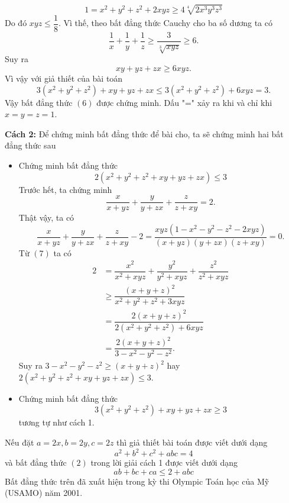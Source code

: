 \begin{bt}
{\begin{itemize}
			$$1=x^2+y^2+z^2+2xyz\geq 4\sqrt[4]{2x^3y^3z^3}$$
			Do đó $xyz\leq \dfrac{1}{8}$. Vì thế, theo bất đẳng thức Cauchy cho ba số dương ta có
			$$\dfrac{1}{x}+\dfrac{1}{y}+\dfrac{1}{z}\geq \dfrac{3}{\sqrt[3]{xyz}}\geq 6.$$
			Suy ra $$xy+yz+zx\geq 6xyz.$$
			Vì vậy với giả thiết của bài toán 
			$$3(x^2+y^2+z^2)+xy+yz+zx\leq 3(x^2+y^2+z^2)+6xyz=3.$$
			Vậy bất đẳng thức $(6)$ được chứng minh. Dấu "=" xảy ra khi và chỉ khi $x=y=z=1$.
		\end{itemize}
		\noindent\textbf{Cách 2:} Để chứng minh bất đẳng thức để bài cho, ta sẽ chứng minh hai bất đẳng thức sau
		\begin{itemize}
			\item Chứng minh bất đẳng thức
			$$2(x^2+y^2+z^2+xy+yz+zx)\leq 3$$
			Trước hết, ta chứng minh 
			\begin{equation}
			\tag{7}
			\dfrac{x}{x+yz}+\dfrac{y}{y+zx}+\dfrac{z}{z+xy}=2.
			\end{equation}
			Thật vậy, ta có
			$$\dfrac{x}{x+yz}+\dfrac{y}{y+zx}+\dfrac{z}{z+xy}-2=\dfrac{xyz(1-x^2-y^2-z^2-2xyz)}{(x+yz)(y+zx)(z+xy)}=0.$$
			Từ $(7)$ ta có
			{\allowdisplaybreaks
			\begin{align*}
			2&=\dfrac{x^2}{x^2+xyz}+\dfrac{y^2}{y^2+xyz}+\dfrac{z^2}{z^2+xyz}\\
			& \geq \dfrac{(x+y+z)^2}{x^2+y^2+z^2+3xyz}\\
			&=\dfrac{2(x+y+z)^2}{2(x^2+y^2+z^2)+6xyz}\\
			&=\dfrac{2(x+y+z)^2}{3-x^2-y^2-z^2}.
			\end{align*}}Suy ra $3-x^2-y^2-z^2\geq (x+y+z)^2$ hay $2(x^2+y^2+z^2+xy+yz+zx)\leq 3$.
			\item Chứng minh bất đẳng thức
			$$3(x^2+y^2+z^2)+xy+yz+zx\geq 3$$
			tương tự như cách 1.
		\end{itemize}
	\begin{nx}
		Nếu đặt $a=2x,b=2y,c=2z$ thì giả thiết bài toán được viết dưới dạng $$a^2+b^2+c^2+abc=4$$
		và bất đẳng thức $(2)$ trong lời giải cách 1 được viết dưới dạng $$ab+bc+ca\leq 2+abc$$
		Bất đẳng thức trên đã xuất hiện trong kỳ thi Olympic Toán học của Mỹ (USAMO) năm 2001.%
	\end{nx}
}
\end{bt}


